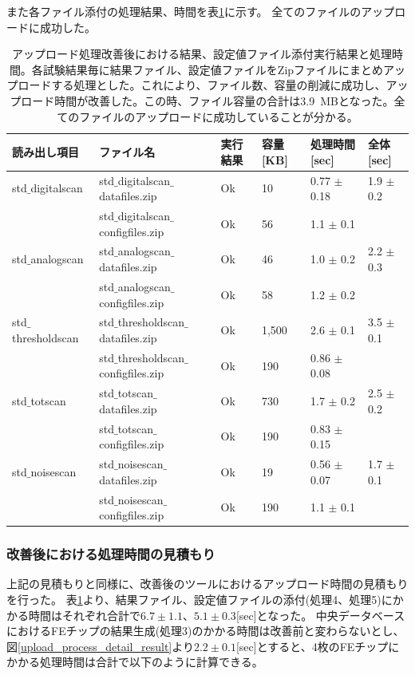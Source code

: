 また各ファイル添付の処理結果、時間を表\ref{upload_status_to_pd_zip}に示す。
全てのファイルのアップロードに成功した。

{\scriptsize
\begin{longtable}{|llllll|}
  \caption[アップロード処理改善後における結果、設定値ファイル添付実行結果と処理時間]{アップロード処理改善後における結果、設定値ファイル添付実行結果と処理時間。各試験結果毎に結果ファイル、設定値ファイルをZipファイルにまとめアップロードする処理とした。これにより、ファイル数、容量の削減に成功し、アップロード時間が改善した。この時、ファイル容量の合計は3.9~MBとなった。全てのファイルのアップロードに成功していることが分かる。}
  \label{upload_status_to_pd_zip}
  \endhead
  \hline
  読み出し項目 & ファイル名 & 実行結果 & 容量[KB] & 処理時間[sec] & 全体[sec] \\ 
  \hline
 std$\_$digitalscan & std$\_$digitalscan$\_$datafiles.zip & Ok & 10 & 0.77 $\pm$ 0.18 & 1.9 $\pm$ 0.2\\
 & std$\_$digitalscan$\_$configfiles.zip & Ok & 56 & 1.1 $\pm$ 0.1 &\\
\hline
 std$\_$analogscan & std$\_$analogscan$\_$datafiles.zip & Ok & 46 & 1.0 $\pm$ 0.2 & 2.2 $\pm$ 0.3 \\
 & std$\_$analogscan$\_$configfiles.zip & Ok & 58 & 1.2 $\pm$ 0.2 &\\
\hline
 std$\_$thresholdscan & std$\_$thresholdscan$\_$datafiles.zip & Ok & 1,500 & 2.6 $\pm$ 0.1 & 3.5 $\pm$ 0.1 \\
 & std$\_$thresholdscan$\_$configfiles.zip & Ok & 190 & 0.86 $\pm$ 0.08 &\\
\hline
 std$\_$totscan & std$\_$totscan$\_$datafiles.zip & Ok & 730 & 1.7 $\pm$ 0.2 & 2.5 $\pm$ 0.2\\
 & std$\_$totscan$\_$configfiles.zip & Ok & 190 & 0.83 $\pm$ 0.15 &\\
\hline
 std$\_$noisescan & std$\_$noisescan$\_$datafiles.zip & Ok & 19 & 0.56 $\pm$ 0.07 & 1.7 $\pm$ 0.1 \\
 & std$\_$noisescan$\_$configfiles.zip & Ok & 190 & 1.1 $\pm$ 0.1 &\\
\hline
\end{longtable}
}

\subsubsection{改善後における処理時間の見積もり}
上記の見積もりと同様に、改善後のツールにおけるアップロード時間の見積もりを行った。
表\ref{upload_status_to_pd_zip}より、結果ファイル、設定値ファイルの添付(処理4、処理5)にかかる時間はそれぞれ合計で$6.7\pm 1.1、5.1\pm 0.3$[sec]となった。
中央データベースにおけるFEチップの結果生成(処理3)のかかる時間は改善前と変わらないとし、図\ref{upload_process_detail_result}より$2.2\pm 0.1$[sec]とすると、4枚のFEチップにかかる処理時間は合計で以下のように計算できる。

